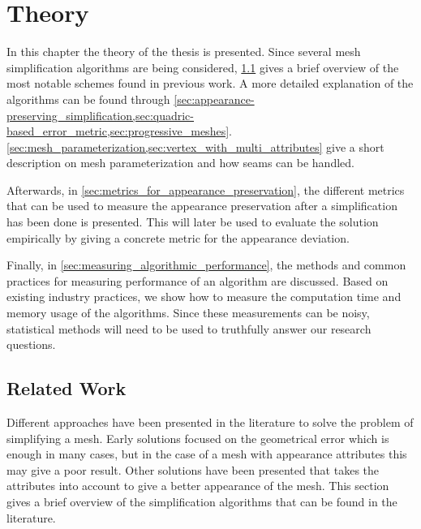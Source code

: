 

\chapter{Theory} \label{ch:theory}
In this chapter the theory of the thesis is presented.
Since several mesh simplification algorithms are being considered, \cref{sec:related_work} gives a brief overview of the most notable schemes found in previous work. A more detailed explanation of the algorithms can be found through \cref{sec:appearance-preserving_simplification,sec:quadric-based_error_metric,sec:progressive_meshes}. \cref{sec:mesh_parameterization,sec:vertex_with_multi_attributes} give a short description on mesh parameterization and how seams can be handled.

Afterwards, in \cref{sec:metrics_for_appearance_preservation}, the different metrics that can be used to measure the appearance preservation after a simplification has been done is presented. This will later be used to evaluate the solution empirically by giving a concrete metric for the appearance deviation.

Finally, in \cref{sec:measuring_algorithmic_performance}, the methods and common practices for measuring performance of an algorithm are discussed. Based on existing industry practices, we show how to measure the computation time and memory usage of the algorithms. Since these measurements can be noisy, statistical methods will need to be used to truthfully answer our research questions.

\section{Related Work} \label{sec:related_work}
Different approaches have been presented in the literature to solve the problem of simplifying a mesh. Early solutions focused on the geometrical error which is enough in many cases, but in the case of a mesh with appearance attributes this may give a poor result. Other solutions have been presented that takes the attributes into account to give a better appearance of the mesh. This section gives a brief overview of the simplification algorithms that can be found in the literature.

